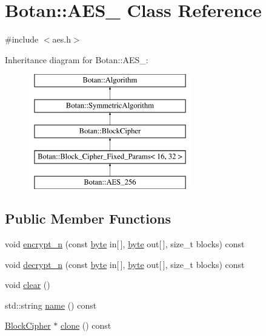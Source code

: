 \hypertarget{classBotan_1_1AES__256}{\section{Botan\-:\-:A\-E\-S\-\_ Class Reference}
\label{classBotan_1_1AES__256}
}


{\ttfamily \#include $<$aes.\-h$>$}

Inheritance diagram for Botan\-:\-:A\-E\-S\-\_\-:\begin{figure}[H]
\begin{center}
\leavevmode
\includegraphics[height=5.000000cm]{classBotan_1_1AES__256}
\end{center}
\end{figure}
\subsection*{Public Member Functions}
\begin{DoxyCompactItemize}
\item 
void \hyperlink{classBotan_1_1AES__256_ab529af5dc567c52354a2c043824e807b}{encrypt\-\_\-n} (const \hyperlink{namespaceBotan_a7d793989d801281df48c6b19616b8b84}{byte} in\mbox{[}$\,$\mbox{]}, \hyperlink{namespaceBotan_a7d793989d801281df48c6b19616b8b84}{byte} out\mbox{[}$\,$\mbox{]}, size\-\_\-t blocks) const 
\item 
void \hyperlink{classBotan_1_1AES__256_abdc5dc4cc1ce2f32d559d2f1ec15a2b3}{decrypt\-\_\-n} (const \hyperlink{namespaceBotan_a7d793989d801281df48c6b19616b8b84}{byte} in\mbox{[}$\,$\mbox{]}, \hyperlink{namespaceBotan_a7d793989d801281df48c6b19616b8b84}{byte} out\mbox{[}$\,$\mbox{]}, size\-\_\-t blocks) const 
\item 
void \hyperlink{classBotan_1_1AES__256_a46e8921f8972dc784929eb54289f26f9}{clear} ()
\item 
std\-::string \hyperlink{classBotan_1_1AES__256_a22a5b0845a82dd4c7849075341c5587d}{name} () const 
\item 
\hyperlink{classBotan_1_1BlockCipher}{Block\-Cipher} $\ast$ \hyperlink{classBotan_1_1AES__256_ab4d4d525d041a59f560271cd94a7b754}{clone} () const 
\end{DoxyCompactItemize}

